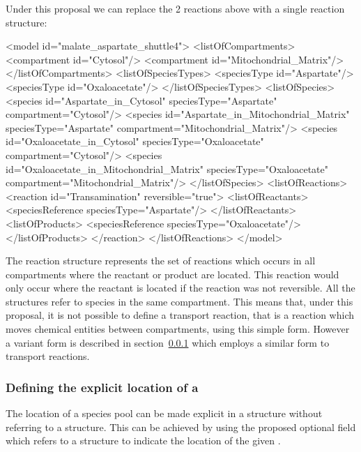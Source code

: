 \documentclass{cekarticle}
\begin{document}
Under this proposal we can replace the 2 reactions above with a single reaction structure:

\begin{example}
<model id="malate_aspartate_shuttle4">
    <listOfCompartments>
        <compartment id="Cytosol"/>
        <compartment id="Mitochondrial_Matrix"/>
    </listOfCompartments>
    <listOfSpeciesTypes>
        <speciesType id="Aspartate"/>
        <speciesType id="Oxaloacetate"/>
    </listOfSpeciesTypes>
    <listOfSpecies>
        <species
            id="Aspartate_in_Cytosol"
            speciesType="Aspartate"
            compartment="Cytosol"/>
        <species
            id="Aspartate_in_Mitochondrial_Matrix"
            speciesType="Aspartate"
            compartment="Mitochondrial_Matrix"/>
        <species
            id="Oxaloacetate_in_Cytosol"
            speciesType="Oxaloacetate"
            compartment="Cytosol"/>
        <species
            id="Oxaloacetate_in_Mitochondrial_Matrix"
            speciesType="Oxaloacetate"
            compartment="Mitochondrial_Matrix"/>
    </listOfSpecies>
    <listOfReactions>
        <reaction id="Transamination" reversible="true">
            <listOfReactants>
                <speciesReference speciesType="Aspartate"/>
            </listOfReactants>
            <listOfProducts>
                <speciesReference speciesType="Oxaloacetate"/>
            </listOfProducts>
        </reaction>
    </listOfReactions>
</model>
\end{example}

The reaction structure represents the set of reactions which occurs in all compartments where 
the reactant or product are located.  This reaction would only occur where the reactant is located
if the reaction was not reversible.  All the  structures refer to 
species in the same compartment.  This means that, under this proposal, it is not possible to define
a transport reaction, that is a reaction which moves chemical entities between compartments,
using this simple form.  However a variant form is described in
section~\ref{sec:locatedspeciesreferences} which employs a similar form to transport reactions.

\subsubsection{Defining the explicit location of a }
\label{sec:locatedspeciesreferences}

The location of a species pool can be made explicit in a  structure
without referring to a  structure.  This can be achieved by using the proposed optional
 field which refers to a  structure to indicate the 
location of the given .
\end{document}
